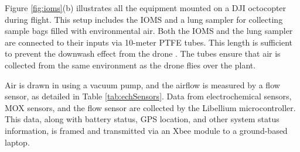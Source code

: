 \documentclass[final,3p,times,twocolumn]{elsarticle}
\begin{document}
\begin{table}[ht]
    \centering
    \caption{Specifications of the MOX sensors included in the slave board}
    \label{tab:moxSensors}
\end{table}

Figure \ref{fig:ioms}(b) illustrates all the equipment mounted on a DJI octocopter during flight. This setup includes the IOMS and a lung sampler for collecting sample bags filled with environmental air. Both the IOMS and the lung sampler are connected to their inputs via 10-meter PTFE tubes. This length is sufficient to prevent the downwash effect from the drone \cite{Yongjun2018,Zhu2021}. The tubes ensure that air is collected from the same environment as the drone flies over the plant.

Air is drawn in using a vacuum pump, and the airflow is measured by a flow sensor, as detailed in Table \ref{tab:echSensors}. Data from electrochemical sensors, MOX sensors, and the flow sensor are collected by the Libellium microcontroller. This data, along with battery status, GPS location, and other system status information, is framed and transmitted via an Xbee module to a ground-based laptop.
\end{document}
